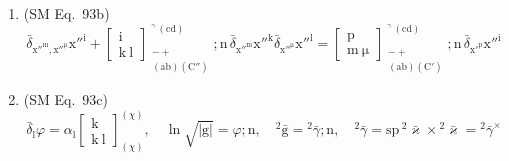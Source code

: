 \documentclass[12pt]{article}
\begin{document}
\begin{enumerate}[label=(\arabic*), series=formellist]
    \item (SM Eq.\ 93b) 
    \[
    \bar{\delta}_{\mathrm{x''^m}, \mathrm{x''^\mu}} \mathrm{x''^i} + \left[ \begin{smallmatrix} \mathrm{i} \\ \mathrm{k\ l} \end{smallmatrix} \right]^{\urcorner(\mathrm{cd})}_{\substack{- + \\ (\mathrm{ab})(\mathrm{C''})}} ; \mathrm{n} \,\bar{\delta}_{\mathrm{x''^m}} \mathrm{x''^k} \bar{\delta}_{\mathrm{x''^\mu}} \mathrm{x''^l} = \left[ \begin{smallmatrix} \mathrm{p} \\ \mathrm{m\ \mu} \end{smallmatrix} \right]^{\urcorner(\mathrm{cd})}_{\substack{- + \\ (\mathrm{ab})(\mathrm{C'})}} ; \mathrm{n} \,\bar{\delta}_{\mathrm{x'^p}} \mathrm{x''^i}
    \]

    \item (SM Eq.\ 93c) 
    \[
    \bar{\delta}_\mathrm{l} \varphi = \alpha_\mathrm{l} \left[ \begin{smallmatrix} \mathrm{k} \\ \mathrm{k\ l} \end{smallmatrix} \right]^{(\chi)}_{(\chi)}, \quad \ln\sqrt{|\mathrm{g}|} = \varphi;\mathrm{n}, \quad {}^2\bar{\mathrm{g}} = {}^2\bar{\gamma};\mathrm{n}, \quad {}^2\bar{\gamma} = \mathrm{sp}\,{}^2\bar{\varkappa} \times {}^2\bar{\varkappa} = {}^2\bar{\gamma}^\times
    \]


\end{enumerate}
\end{document}
